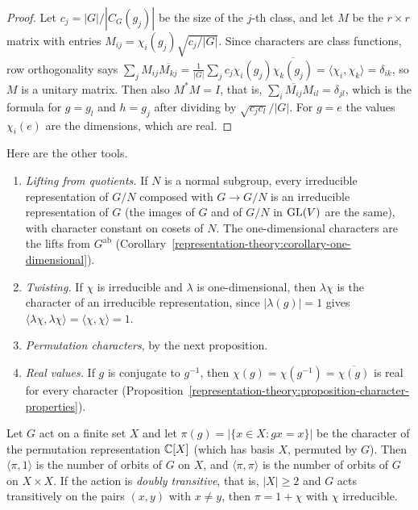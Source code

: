 \begin{proof}
Let $c_j = |G|/|C_G(g_j)|$ be the size of the $j$-th class, and let $M$ be the $r \times r$ matrix with entries $M_{ij} = \chi_i(g_j)\sqrt{c_j/|G|}$. Since characters are
class functions, row orthogonality says $\sum_jM_{ij}\overline{M_{kj}} = \frac{1}{|G|}\sum_jc_j\chi_i(g_j)\overline{\chi_k(g_j)} = \langle\chi_i, \chi_k\rangle = \delta_{ik}$, so $M$ is a unitary matrix.
Then also $M^*M = I$, that is, $\sum_i\overline{M_{ij}}M_{il} = \delta_{jl}$, which is the formula for $g = g_l$ and $h = g_j$ after dividing by $\sqrt{c_jc_l}/|G|$. For $g = e$ the
values $\chi_i(e)$ are the dimensions, which are real.
\end{proof}

Here are the other tools.
\begin{enumerate}
\item \emph{Lifting from quotients.} If $N$ is a normal subgroup, every irreducible representation of $G/N$ composed with $G \to G/N$ is an irreducible representation of $G$ (the
images of $G$ and of $G/N$ in $\mathrm{GL}(V)$ are the same), with character constant on cosets of $N$. The one-dimensional characters are the lifts from $G^{\mathrm{ab}}$
(Corollary~\ref{representation-theory:corollary-one-dimensional}).
\item \emph{Twisting.} If $\chi$ is irreducible and $\lambda$ is one-dimensional, then $\lambda\chi$ is the character of an irreducible representation, since
$|\lambda(g)| = 1$ gives $\langle\lambda\chi, \lambda\chi\rangle = \langle\chi, \chi\rangle = 1$.
\item \emph{Permutation characters}, by the next proposition.
\item \emph{Real values.} If $g$ is conjugate to $g^{-1}$, then $\chi(g) = \chi(g^{-1}) = \overline{\chi(g)}$ is real for every character
(Proposition~\ref{representation-theory:proposition-character-properties}).
\end{enumerate}

\begin{proposition}\label{representation-theory:proposition-permutation-character}
Let $G$ act on a finite set $X$ and let $\pi(g) = |\{x \in X : gx = x\}|$ be the character of the permutation representation $\mathbb{C}[X]$ (which has basis $X$, permuted by
$G$). Then $\langle\pi, 1\rangle$ is the number of orbits of $G$ on $X$, and $\langle\pi, \pi\rangle$ is the number of orbits of $G$ on $X \times X$. If the action is
\emph{doubly transitive}, that is, $|X| \geq 2$ and $G$ acts transitively on the pairs $(x, y)$ with $x \neq y$, then $\pi = 1 + \chi$ with $\chi$ irreducible.
\end{proposition}

